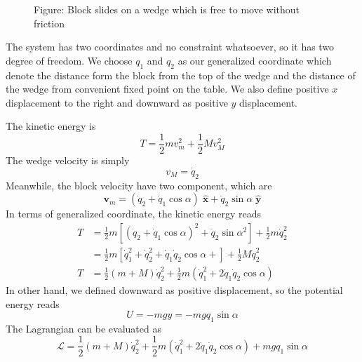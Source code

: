 \documentclass[../../../main.tex]{subfiles}
\begin{document}
\begin{figure*}[b]
	\centering
	\caption*{Figure: Block slides on a wedge which is free to move without friction}
\end{figure*}

The system has two coordinates and no constraint whatsoever, so it has two degree of freedom.
We choose $q_1$ and $q_2$ as our generalized coordinate which denote the distance form the block from the top of the wedge and the distance of the wedge from convenient fixed point on the table.
We also define positive $x$ displacement to the right and downward as positive $y$ displacement.

The kinetic energy is
\begin{equation*}
	T=\frac{1}{2}mv_m^2+\frac{1}{2}Mv_M^2
\end{equation*}
The wedge velocity is simply
\begin{equation*}
	v_M=\dot{q}_2
\end{equation*}
Meanwhile, the block velocity have two component, which are
\begin{equation*}
	\mathbf{v}_m=\left(\dot{q}_2+\dot{q}_1\cos\alpha\right)\;\mathbf{\hat{x}}+\dot{q}_2\sin\alpha\;\mathbf{\hat{y}}
\end{equation*}
In terms of generalized coordinate, the kinetic energy reads
\begin{align*}
	T & =\frac{1}{2}m\left[\left(\dot{q}_2+\dot{q}_1\cos\alpha\right)^2+\dot{q}_2\sin\alpha^2\right]+\frac{1}{2}m\dot{q}_2^2 \\
	  & =\frac{1}{2}m\left[\dot{q}_1^2+\dot{q}_2^2+\dot{q}_1\dot{q}_2\cos\alpha+\right]+\frac{1}{2}M\dot{q}_2^2              \\
	T & =\frac{1}{2}(m+M)\dot{q}_2^2+\frac{1}{2}m\left(\dot{q}_1^2+2\dot{q}_1\dot{q}_2\cos\alpha\right)
\end{align*}
In other hand, we defined downward as positive displacement, so the potential energy reads
\begin{equation*}
	U=-mgy=-mgq_1\sin\alpha
\end{equation*}
The Lagrangian can be evaluated as
\begin{equation*}
	\mathcal{L}=\frac{1}{2}(m+M)\dot{q}_2^2+\frac{1}{2}m\left(\dot{q}_1^2+2\dot{q}_1\dot{q}_2\cos\alpha\right)+mgq_1\sin\alpha
\end{equation*}
\end{document}
